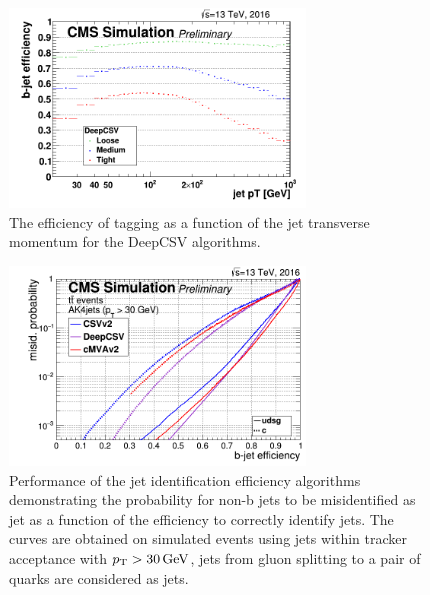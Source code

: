 \begin{figure}\centering
    \includegraphics[width=0.7\textwidth]{figure/reco_beff.png}
    \caption
    {
        The efficiency of \PQb tagging as a function of the jet transverse momentum for the DeepCSV algorithms. 
    }
    \label{fig:reco_beff}
\end{figure}

\begin{figure}\centering
    \includegraphics[width=0.7\textwidth]{figure/reco_misb.png}
    \caption[\PQb misidentified efficiency as a function of the \PQb tagging efficiency.]
    {
        Performance of the \PQb jet identification efficiency algorithms demonstrating the probability for non-b jets to be misidentified as \PQb jet as a function of the efficiency to correctly identify \PQb jets. 
        The curves are obtained on simulated \ttbar events using jets within tracker acceptance with $p_{\mathrm{T}}>30 \,\text{Ge\hspace{-.08em}V}$, \PQb jets from gluon splitting to a pair of \PQb quarks are considered as \PQb jets.
    }
    \label{fig:reco_misb}
\end{figure}
